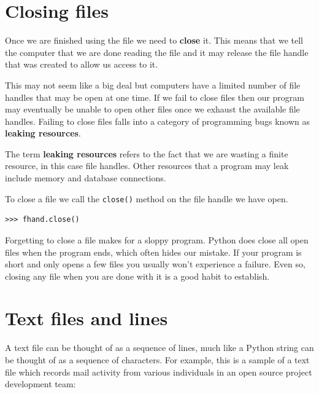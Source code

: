\section {Closing files} 


Once we are finished using the file we need to \textbf{close} it. This means that we tell the computer that we are done reading the file and it may release the file handle that was created to allow us access to it.

This may not seem like a big deal but computers have a limited number of file handles that may be open at one time. If we fail to close files then our program may eventually be unable to open other files once we exhaust the available file handles. Failing to close files falls into a category of programming bugs known as \textbf{leaking resources}.


The term \textbf{leaking resources} refers to the fact that we are wasting a finite resource, in this case file handles. Other resources that a program may leak include memory and database connections.

To close a file we call the \texttt{close()} method on the file handle we have open. 

\beforeverb
\begin{verbatim}
>>> fhand.close()
\end{verbatim}
\afterverb
%

Forgetting to close a file makes for a sloppy program. Python does close all open files when the program ends, which often hides our mistake.  If your program is short and only opens a few files you usually won't experience a failure. Even so, closing any file when you are done with it is a good habit to establish.


\section{Text files and lines}

A text file can be thought of as a sequence of lines, much like a Python
string can be thought of as a sequence of characters.  For example, this
is a sample of a text file which records mail activity from various
individuals in an open source project development team:

